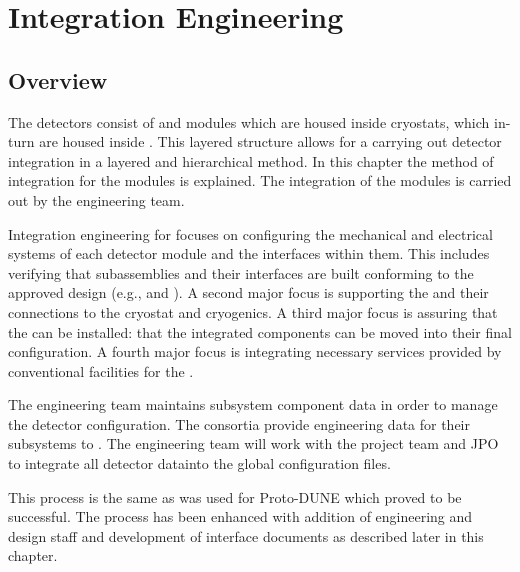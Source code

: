 ﻿\chapter{Integration Engineering}
\label{sec:fdsp-coord-integ-sysengr}

\section{Overview}
\label{sec:fdsp-overview}

The detectors consist of  and  modules which are housed
inside cryostats, which in-turn are housed inside . This layered structure allows for a
carrying out detector integration in a layered and hierarchical method. In this chapter the method of integration for the modules is explained.  The integration of the modules is carried out by the  
engineering team. 

Integration engineering for  focuses on configuring the
mechanical and electrical systems of each detector module and the interfaces
within them. This includes verifying that subassemblies and their
interfaces are built conforming to the approved design (e.g.,  and  ). A
second major focus is supporting the  and their
connections to the cryostat and cryogenics. A third major focus is
assuring that the  can be installed: that the
integrated components can be moved into their final configuration. A
fourth major focus is integrating necessary services provided by
conventional facilities for the .


The  engineering team maintains subsystem component data in order to manage
the detector configuration. The consortia provide engineering data for
their subsystems to . The  engineering team will
work with the  project team and JPO to integrate all detector datainto the global  configuration files. 

This process is the same as was used for Proto-DUNE which proved to be successful. The process has been enhanced with addition of engineering and design staff and development of interface documents as described later in this chapter. 




